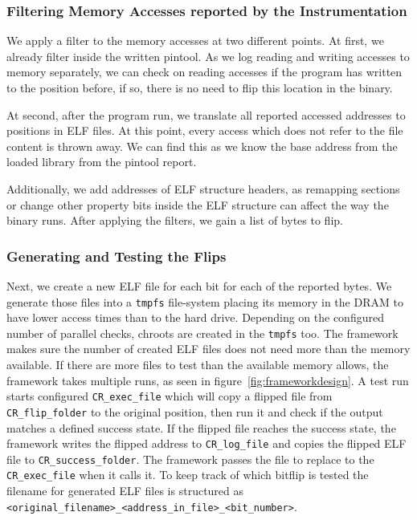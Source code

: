 \subsubsection{Filtering Memory Accesses reported by the Instrumentation}

We apply a filter to the memory accesses at two different points. At first, we
already filter inside the written pintool. As we log reading and writing
accesses to memory separately, we can check on reading accesses if the program
has written to the position before, if so, there is no need to flip this
location in the binary.

At second, after the program run, we translate all reported accessed addresses
to positions in ELF files. At this point, every access which does not refer to
the file content is thrown away. We can find this as we know the base address
from the loaded library from the pintool report.

Additionally, we add addresses of ELF structure headers, as remapping sections
or change other property bits inside the ELF structure can affect the way the
binary runs. After applying the filters, we gain a list of bytes to flip.

\subsubsection{Generating and Testing the Flips}

Next, we create a new ELF file for each bit for each of the reported bytes. We
generate those files into a \texttt{tmpfs} file-system placing its memory in the
DRAM to have lower access times than to the hard drive. Depending on the
configured number of parallel checks, chroots are created in the \texttt{tmpfs}
too. The framework makes sure the number of created ELF files does not need more
than the memory available. If there are more files to test than the available
memory allows, the framework takes multiple runs, as seen in
figure~\ref{fig:frameworkdesign}. A test run starts configured
\texttt{CR\_exec\_file} which will copy a flipped file from
\texttt{CR\_flip\_folder} to the original position, then run it and check if the
output matches a defined success state. If the flipped file reaches the success
state, the framework writes the flipped address to \texttt{CR\_log\_file} and
copies the flipped ELF file to \texttt{CR\_success\_folder}. The framework
passes the file to replace to the \texttt{CR\_exec\_file} when it calls it. To
keep track of which bitflip is tested the filename for generated ELF files is
structured as \texttt{<original\_filename>\_<address\_in\_file>\_<bit\_number>}.

